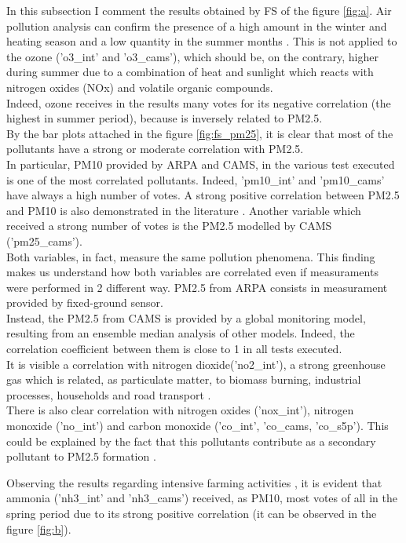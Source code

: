 In this subsection I comment the results obtained by FS of the figure \ref{fig:a}.
Air pollution analysis can confirm the presence of a high amount in the winter and heating season and a low quantity in the summer months \cite{cichowicz2017dispersion}. This is not applied to the ozone ('o3\_int' and 'o3\_cams'), which should be, on the contrary, higher during summer due to a combination of heat and sunlight which reacts with nitrogen oxides (NOx) and volatile organic compounds.\\
Indeed, ozone receives in the results many votes for its negative correlation (the highest in summer period), because is inversely related to PM2.5.\\
By the bar plots attached in the figure \ref{fig:fs_pm25}, it is clear that most of the pollutants have a strong or moderate correlation with PM2.5. \\
In particular, PM10 provided by ARPA and CAMS, in the various test executed is one of the most correlated pollutants. Indeed, 'pm10\_int' and 'pm10\_cams' have always a high number of votes.
A strong positive correlation between PM2.5 and PM10 is also demonstrated in the literature \cite{zhou2016concentrations}.
Another variable which received a strong number of votes is the PM2.5 modelled by CAMS ('pm25\_cams'). \\
Both variables, in fact, measure the same pollution phenomena.
This finding makes us understand how both variables are correlated even if measuraments were performed in 2 different way. PM2.5 from ARPA consists in measurament provided by fixed-ground sensor.\\
Instead, the PM2.5 from CAMS is provided by a global monitoring model, resulting from an ensemble median analysis of other models.
Indeed, the correlation coefficient between them is close to 1 in all tests executed.\\
It is visible a correlation with nitrogen dioxide('no2\_int'), a strong greenhouse gas which is related, as particulate matter, to biomass burning, industrial processes, households and road transport \cite{zellner2000john} \cite{maranzano2022air}.\\
There is also clear correlation with nitrogen oxides ('nox\_int'), nitrogen monoxide ('no\_int') and carbon monoxide ('co\_int', 'co\_cams, 'co\_s5p'). This could be explained by the fact that this pollutants contribute as a secondary pollutant to PM2.5 formation \cite{xie2015spatiotemporal}.
\par
Observing the results regarding intensive farming activities , it is evident that ammonia ('nh3\_int' and 'nh3\_cams') received, as PM10, most votes of all in the spring period due to its strong positive correlation (it can be observed in the figure \ref{fig:b}). \\
